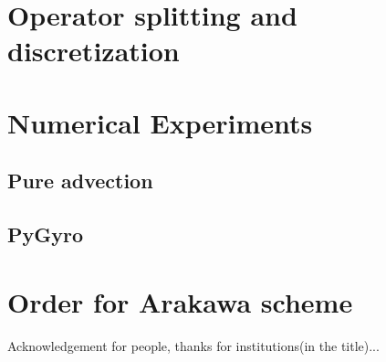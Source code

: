 \documentclass[proc]{edpsmath}
\begin{document}
\maketitle




\section{Operator splitting and discretization}
	\label{sec:splitting_discretization}
	

\section{Numerical Experiments}
	\subsection{Pure advection}
	\subsection{PyGyro}

\appendix
\section{Order for Arakawa scheme}
\label{sec:ara_order}



\begin{acknowledgement}
Acknowledgement for people, thanks for institutions(in the title)...
\end{acknowledgement}



\end{document}

